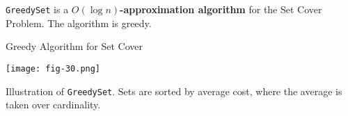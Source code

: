 \begin{thm}
	\texttt{GreedySet} is a \textbf{$O(\log n)$-approximation algorithm} for the Set Cover Problem. The algorithm is greedy.
\end{thm}

\begin{algorithm}
	  \caption{Greedy Algorithm for Set Cover}\label{setcovergreedy}
\end{algorithm}

\begin{marginfigure}
	\texttt{[image: fig-30.png]}
	\caption{Illustration of \texttt{GreedySet}. Sets are sorted by average cost, where the average is taken over cardinality.}
\end{marginfigure}

